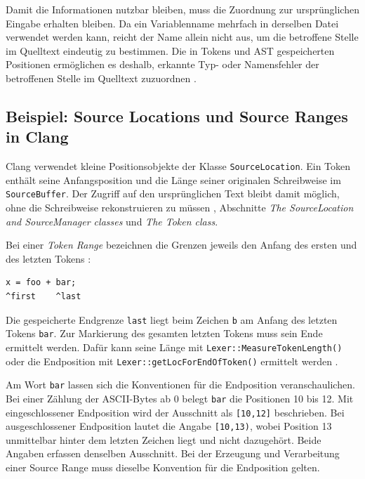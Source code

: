 \documentclass[11pt,a4paper]{article}
\newcommand{\code}[1]{\texttt{#1}}
\begin{document}
Damit die Informationen nutzbar bleiben, muss die Zuordnung zur ursprünglichen Eingabe erhalten bleiben. Da ein Variablenname mehrfach in derselben Datei verwendet werden kann, reicht der Name allein nicht aus, um die betroffene Stelle im Quelltext eindeutig zu bestimmen. Die in Tokens und AST gespeicherten Positionen ermöglichen es deshalb, erkannte Typ- oder Namensfehler der betroffenen Stelle im Quelltext zuzuordnen \parencite{clang}.

\subsection{Beispiel: Source Locations und Source Ranges in Clang}
Clang verwendet kleine Positionsobjekte der Klasse \code{SourceLocation}. Ein Token enthält seine Anfangsposition und die Länge seiner originalen Schreibweise im \code{SourceBuffer}. Der Zugriff auf den ursprünglichen Text bleibt damit möglich, ohne die Schreibweise rekonstruieren zu müssen \parencite{clang}, Abschnitte \emph{The SourceLocation and SourceManager classes} und \emph{The Token class}.

Bei einer \emph{Token Range} bezeichnen die Grenzen jeweils den Anfang des ersten und des letzten Tokens \parencite{clang}:
\par\noindent\begin{minipage}{\linewidth}
\begin{lstlisting}[caption={Originalbeispiel für eine Token Range}]
x = foo + bar;
^first    ^last
\end{lstlisting}
\end{minipage}\par
Die gespeicherte Endgrenze \code{last} liegt beim Zeichen \code{b} am Anfang des letzten Tokens \code{bar}. Zur Markierung des gesamten letzten Tokens muss sein Ende ermittelt werden. Dafür kann seine Länge mit \code{Lexer::MeasureTokenLength()} oder die Endposition mit \code{Lexer::getLocForEndOfToken()} ermittelt werden \parencite{clang}.

Am Wort \code{bar} lassen sich die Konventionen für die Endposition veranschaulichen. Bei einer Zählung der ASCII-Bytes ab 0 belegt \code{bar} die Positionen 10 bis 12. Mit eingeschlossener Endposition wird der Ausschnitt als \code{[10,12]} beschrieben. Bei ausgeschlossener Endposition lautet die Angabe \code{[10,13)}, wobei Position 13 unmittelbar hinter dem letzten Zeichen liegt und nicht dazugehört. Beide Angaben erfassen denselben Ausschnitt. Bei der Erzeugung und Verarbeitung einer Source Range muss dieselbe Konvention für die Endposition gelten.
\end{document}
